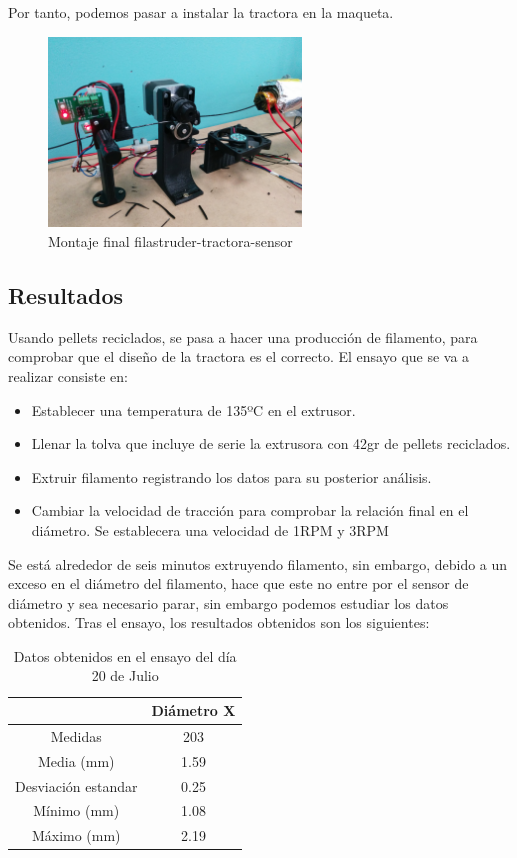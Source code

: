 Por tanto, podemos pasar a instalar la tractora en la maqueta.

\begin{figure}[H]
    \centering
    \includegraphics[width=0.6\textwidth]{images/producciones/tractora/IMG_20150709_130326.jpg}
    \caption{Montaje final filastruder-tractora-sensor}
    \label{fig:montaje_final}
\end{figure}

\subsection{Resultados}

Usando pellets reciclados, se pasa a hacer una producción de filamento, para comprobar que el diseño de la tractora es el correcto. El ensayo que se va a realizar consiste en:

\begin{itemize}
    \item{Establecer una temperatura de 135ºC en el extrusor.}
    \item{Llenar la tolva que incluye de serie la extrusora con 42gr de pellets reciclados.}
    \item{Extruir filamento registrando los datos para su posterior análisis.}
    \item{Cambiar la velocidad de tracción para comprobar la relación final en el diámetro. Se establecera una velocidad de 1RPM y 3RPM}
\end{itemize}

Se está alrededor de seis minutos extruyendo filamento, sin embargo, debido a un exceso en el diámetro del filamento, hace que este no entre por el sensor de diámetro y sea necesario parar, sin embargo podemos estudiar los datos obtenidos.
Tras el ensayo, los resultados obtenidos son los siguientes:

\begin{table}[H]
    \centering
    \begin{tabular}{cc}
               & Diámetro X \\ \hline
    Medidas    & 203        \\
    Media (mm) & 1.59       \\
    Desviación estandar & 0.25\\
    Mínimo (mm)   & 1.08       \\
    Máximo (mm)   & 2.19      
    \end{tabular}
    \caption{Datos obtenidos en el ensayo del día 20 de Julio}
    \label{tab:20007105-dat}
\end{table}

